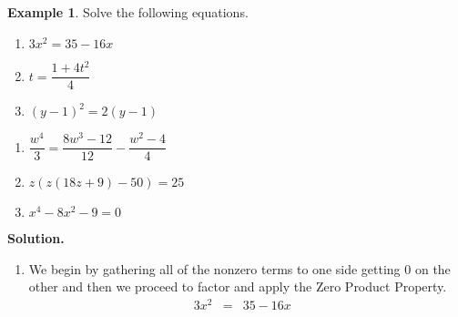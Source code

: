 \documentclass[11pt]{article}
\theoremstyle{definition}  %
\newtheorem{ex}{\bf Example}
\newcounter{HW}
\begin{document}
\begin{ex}\label{solveeqnbyfactoring}  Solve the following equations.

\begin{multicols}{3}

\begin{enumerate}

\item  $3x^2 = 35 - 16x$

\item  $t = \dfrac{1+4t^2}{4}$

\item  $(y-1)^2 = 2(y-1)$

\setcounter{HW}{\value{enumi}}

\end{enumerate}

\end{multicols}

\begin{multicols}{3}

\begin{enumerate}

\setcounter{enumi}{\value{HW}}

\item  $\dfrac{w^4}{3} = \dfrac{8w^3-12}{12} - \dfrac{w^2-4}{4}$

\item  $z(z(18z+9)-50) = 25$

\item  $x^4-8x^2 - 9 = 0$

\setcounter{HW}{\value{enumi}}

\end{enumerate}

\end{multicols}

\pagebreak

{\bf Solution.}

\begin{enumerate}

\item  We begin by gathering all of the nonzero terms to one side getting $0$ on the other and then we proceed to factor and apply the Zero Product Property. \[ \begin{array}{rclr}

3x^2 & = & 35 - 16x & \\


\end{array}\]
\end{enumerate}
\end{ex}
\end{document}
